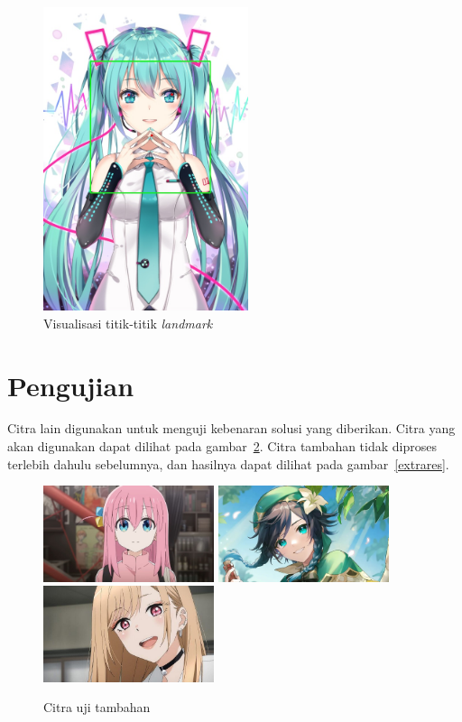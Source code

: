 \documentclass[conference, a4paper]{IEEEtran}
\begin{document}
\begin{figure}[ht]
  \begin{center}
    \includegraphics[width=6cm]{img/result.jpg}
  \end{center}
  \caption{Visualisasi titik-titik \textit{landmark}}\label{landmark}
\end{figure}

\section{Pengujian}
Citra lain digunakan untuk menguji kebenaran solusi yang diberikan. Citra yang akan digunakan dapat dilihat pada gambar~\ref{extratests}. Citra tambahan tidak diproses terlebih dahulu sebelumnya, dan hasilnya dapat dilihat pada gambar~\ref{extrares}.

\begin{figure}[h]
  \begin{center}
    \includegraphics[width=5cm]{img/bocchi.jpg}
    \includegraphics[width=5cm]{img/venti.jpg}
    \includegraphics[width=5cm]{img/marin.jpg}
  \end{center}
  \caption{Citra uji tambahan}\label{extratests}
\end{figure}
\end{document}
